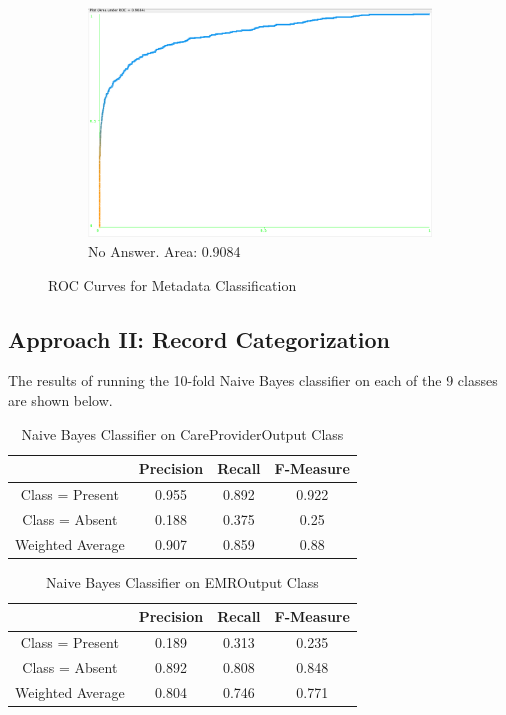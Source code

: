\documentclass[11pt, notitlepage,abstracton,oneside]{article}   	%
\begin{document}
\begin{figure}[ht]
\begin{subfigure}[b]{0.4\textwidth}
        \includegraphics[width=\textwidth]{figures/no-answer}
        \caption{No Answer. Area: 0.9084}
        \label{fig:no-figure}
    \end{subfigure}          
    \caption{ROC Curves for Metadata Classification}
    \label{fig:ROC Curves}
\end{figure}

\subsection{Approach II: Record Categorization}

The results of running the 10-fold Naive Bayes classifier on each of the 9 classes are shown below.

\begin{table}[htdp]
\caption{Naive Bayes Classifier on CareProviderOutput Class}
\begin{center}
\begin{tabular}{|c|c|c|c|}
\hline
& Precision & Recall & F-Measure \\ \hline
Class = Present & 0.955 & 0.892 & 0.922 \\ \hline
Class = Absent & 0.188 & 0.375 & 0.25 \\ \hline
Weighted Average & 0.907 & 0.859 & 0.88 \\ \hline
\end{tabular}
\end{center}
\label{default}
\end{table}%

\begin{table}[htdp]
\caption{Naive Bayes Classifier on EMROutput Class}
\begin{center}
\begin{tabular}{|c|c|c|c|}
\hline
& Precision & Recall & F-Measure \\ \hline
Class = Present & 0.189 & 0.313 & 0.235 \\ \hline
Class = Absent & 0.892 & 0.808 & 0.848 \\ \hline
Weighted Average & 0.804 & 0.746 & 0.771\\ \hline
\end{tabular}
\end{center}
\label{default}
\end{table}%
\end{document}
